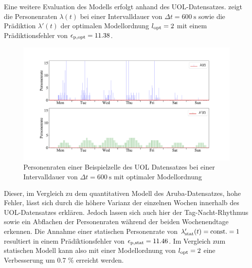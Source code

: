 Eine weitere Evaluation des Modells erfolgt anhand des UOL-Datensatzes.  zeigt die Personenraten $\lambda (t)$ bei einer Intervalldauer von $\Delta t = \SI{600}{\second}$ sowie die Prädiktion $\lambda ' (t) $ der optimalen Modellordnung $l_{\mathrm{opt}} = 2$ mit einem Prädiktionsfehler von $\epsilon_{\mathrm{p,opt}} = 11.38$.
\begin{figure}[!h]
	\centering
	\includegraphics[width=1.0\linewidth]{Abbildungen/evaluation/bin_size_influence_cell_row_23_col_25_float_600}
	\caption{Personenraten einer Beispielzelle des UOL Datensatzes bei einer Intervalldauer von $\Delta t = \SI{600}{\second}$ mit optimaler Modellordnung}
	\label{fig.bin_size_influence_cell_row_23_col_25_float_600}
\end{figure}

Dieser, im Vergleich zu dem quantitativen Modell des Aruba-Datensatzes, hohe Fehler, lässt sich durch die höhere Varianz der einzelnen Wochen innerhalb des UOL-Datensatzes erklären. Jedoch lassen sich auch hier der Tag-Nacht-Rhythmus sowie ein Abflachen der Personenraten während der beiden Wochenendtage erkennen. Die Annahme einer statischen Personenrate von $\lambda_{\mathrm{stat}} ' (t) = \mathrm{const}. = 1 $ resultiert in einem Prädiktionsfehler von $\epsilon_{\mathrm{p,stat}} = 11.46$. Im Vergleich zum statischen Modell kann also mit einer Modellordnung von $l_{\mathrm{opt}} = 2$ eine Verbesserung um 0.7 \% erreicht werden.

